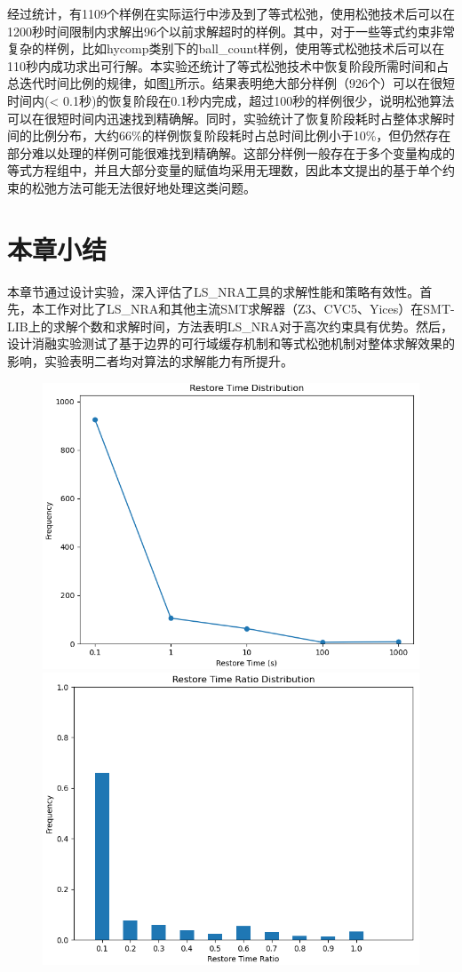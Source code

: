 经过统计，有1109个样例在实际运行中涉及到了等式松弛，使用松弛技术后可以在1200秒时间限制内求解出96个以前求解超时的样例。其中，对于一些等式约束非常复杂的样例，比如hycomp类别下的ball\_count样例，使用等式松弛技术后可以在110秒内成功求出可行解。本实验还统计了等式松弛技术中恢复阶段所需时间和占总迭代时间比例的规律，如图\ref{fig:restore2}所示。结果表明绝大部分样例（926个）可以在很短时间内(< 0.1秒)的恢复阶段在0.1秒内完成，超过100秒的样例很少，说明松弛算法可以在很短时间内迅速找到精确解。同时，实验统计了恢复阶段耗时占整体求解时间的比例分布，大约66\%的样例恢复阶段耗时占总时间比例小于10\%，但仍然存在部分难以处理的样例可能很难找到精确解。这部分样例一般存在于多个变量构成的等式方程组中，并且大部分变量的赋值均采用无理数，因此本文提出的基于单个约束的松弛方法可能无法很好地处理这类问题。

\section{本章小结}
本章节通过设计实验，深入评估了LS\_NRA工具的求解性能和策略有效性。首先，本工作对比了LS\_NRA和其他主流SMT求解器（Z3、CVC5、Yices）在SMT-LIB上的求解个数和求解时间，方法表明LS\_NRA对于高次约束具有优势。然后，设计消融实验测试了基于边界的可行域缓存机制和等式松弛机制对整体求解效果的影响，实验表明二者均对算法的求解能力有所提升。

\begin{figure}[t]
    \centering
    \includegraphics[width=0.45\columnwidth]{Img/restore_time.png}\qquad
    \includegraphics[width=0.45\columnwidth]{Img/restore_ratio.png}
\label{fig:restore2}
\end{figure}

